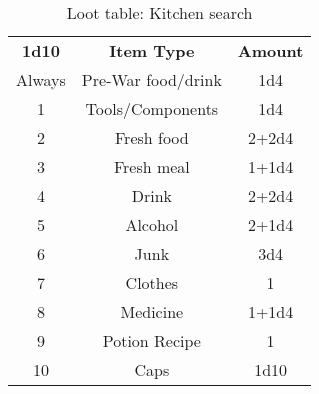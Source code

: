 \documentclass[11pt,a4paper,twocolumn]{book}
\begin{document}
    \begin{table}%
        \centering
        \caption{Loot table: Kitchen search}
        \begin{tabular}{|c|c|c|}
           \hline
           \textbf{1d10}    & \textbf{Item Type}    & \textbf{Amount}  \\
                    Always  & Pre-War food/drink    & 1d4           \\
                    1       & Tools/Components      & 1d4           \\
                    2       & Fresh food            & 2+2d4         \\
                    3       & Fresh meal            & 1+1d4          \\ 
                    4       & Drink                 & 2+2d4          \\    
                    5       & Alcohol               & 2+1d4         \\
                    6       & Junk                  & 3d4           \\  
                    7       & Clothes               & 1           \\  
                    8       & Medicine              & 1+1d4         \\
                    9       & Potion Recipe         & 1           \\
                    10      & Caps                  & 1d10   \\ \hline
        \end{tabular}
        \label{tab:my_label}
    \end{table}
\end{document}
